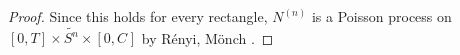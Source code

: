\documentclass[12pt]{article}
\renewcommand{\S}{S}							%
\newcommand{\carp}[1]{^{#1}}					%
\newcommand{\const}{C}							%
\newcommand{\sln}[1]{^{(#1)}}						%
\newcommand{\poiss}{N}							%
\newcommand{\alt}[1]{\widetilde{#1}}			%
\newcommand{\indx}[1]{_{#1}}					%
\begin{document}
\begin{proof}
Since this holds for every rectangle, \(\poiss\sln{n}\) is a Poisson process on \([0,T]\times \alt{\S\carp{n}}\times [0,\const\indx{}]\) by R\'enyi, M\"onch \cite[Theorem 9.2.XII]{DalVer08}.



\end{proof}
\newpage


\end{document}
